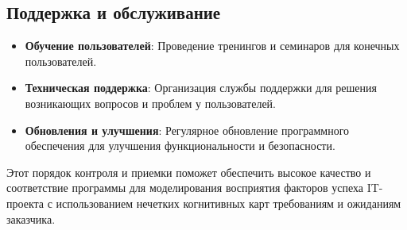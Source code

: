 \documentclass{article}
\begin{document}
    \subsection{Поддержка и обслуживание}
    \begin{itemize}
        \item \textbf{Обучение пользователей}: Проведение тренингов и семинаров для конечных пользователей.
        \item \textbf{Техническая поддержка}: Организация службы поддержки для решения возникающих вопросов и проблем у пользователей.
        \item \textbf{Обновления и улучшения}: Регулярное обновление программного обеспечения для улучшения функциональности и безопасности.
    \end{itemize}

    Этот порядок контроля и приемки поможет обеспечить высокое качество и соответствие программы для моделирования восприятия факторов успеха IT-проекта с использованием нечетких когнитивных карт требованиям и ожиданиям заказчика.

    \newpage
\end{document}
